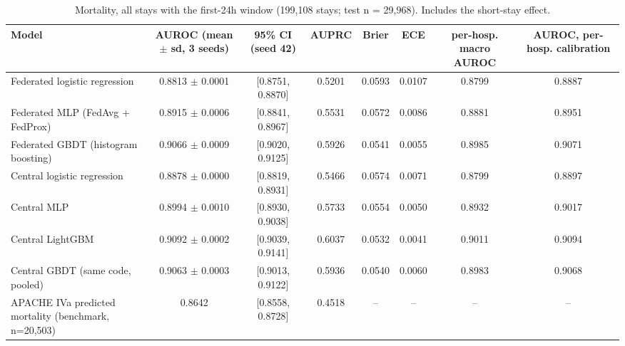 \begin{table}[t]
\centering\small
\caption{Mortality, all stays with the first-24h window (199,108 stays; test n = 29,968). Includes the short-stay effect.}\label{tab:mort_all}
\begin{tabular}{lccccccc}
\toprule
Model & AUROC (mean $\pm$ sd, 3 seeds) & 95\% CI (seed 42) & AUPRC & Brier & ECE & per-hosp. macro AUROC & AUROC, per-hosp. calibration \\
\midrule
Federated logistic regression & 0.8813 $\pm$ 0.0001 & [0.8751, 0.8870] & 0.5201 & 0.0593 & 0.0107 & 0.8799 & 0.8887 \\
Federated MLP (FedAvg + FedProx) & 0.8915 $\pm$ 0.0006 & [0.8841, 0.8967] & 0.5531 & 0.0572 & 0.0086 & 0.8881 & 0.8951 \\
Federated GBDT (histogram boosting) & 0.9066 $\pm$ 0.0009 & [0.9020, 0.9125] & 0.5926 & 0.0541 & 0.0055 & 0.8985 & 0.9071 \\
Central logistic regression & 0.8878 $\pm$ 0.0000 & [0.8819, 0.8931] & 0.5466 & 0.0574 & 0.0071 & 0.8799 & 0.8897 \\
Central MLP & 0.8994 $\pm$ 0.0010 & [0.8930, 0.9038] & 0.5733 & 0.0554 & 0.0050 & 0.8932 & 0.9017 \\
Central LightGBM & 0.9092 $\pm$ 0.0002 & [0.9039, 0.9141] & 0.6037 & 0.0532 & 0.0041 & 0.9011 & 0.9094 \\
Central GBDT (same code, pooled) & 0.9063 $\pm$ 0.0003 & [0.9013, 0.9122] & 0.5936 & 0.0540 & 0.0060 & 0.8983 & 0.9068 \\
APACHE IVa predicted mortality (benchmark, n=20,503) & 0.8642 & [0.8558, 0.8728] & 0.4518 & – & – & – & – \\
\bottomrule
\end{tabular}
\end{table}

